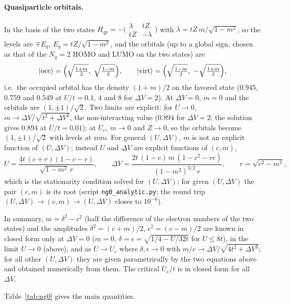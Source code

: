 \documentclass[11pt]{article}
\newcommand{\Ng}{N_{g}}
\newcommand{\dV}{\Delta V}
\begin{document}
\paragraph{Quasiparticle orbitals.} In the basis of the two states $H_{qp}=-\bigl(\begin{smallmatrix}\lambda & tZ\\ tZ & -\lambda\end{smallmatrix}\bigr)$ with $\lambda=tZ\,m/\sqrt{1-m^2}$, so the levels are $\mp E_q$, $E_q=tZ/\sqrt{1-m^2}$, and the orbitals (up to a global sign, chosen as that of the $\Ng=2$ HOMO and LUMO on the two states) are
\begin{equation}
  |{\rm occ}\rangle=\Bigl(\sqrt{\tfrac{1+m}{2}},\ \sqrt{\tfrac{1-m}{2}}\Bigr),\qquad
  |{\rm virt}\rangle=\Bigl(\sqrt{\tfrac{1-m}{2}},\ -\sqrt{\tfrac{1+m}{2}}\Bigr),
\end{equation}
i.e.\ the occupied orbital has the density $(1+m)/2$ on the favored state ($0.945$, $0.759$ and $0.549$ at $U/t=0.1$, $4$ and $8$ for $\dV=2$). At $\dV=0$, $m=0$ and the orbitals are $(1,\pm1)/\sqrt2$.
Two limits are explicit: for $U\to0$, $m\to\dV/\sqrt{t^2+\dV^2}$, the non-interacting value ($0.894$ for $\dV=2$; the solution gives $0.894$ at $U/t=0.01$); at $U_c$, $m\to0$ and $Z\to0$, so the orbitals become $(1,\pm1)/\sqrt2$ with levels at zero.
For general $(U,\dV)$, $m$ is not an explicit function of $(U,\dV)$; instead $U$ and $\dV$ are explicit functions of $(c,m)$,
\begin{equation}
  U=\frac{4t\,(c+r)(1-c-r)}{\sqrt{1-m^2}\,r},\qquad
  \dV=\frac{2t\,(1-c)\,m\,(1-c^2-rc)}{(1-m^2)^{3/2}\,r},\qquad r=\sqrt{c^2-m^2},
\end{equation}
which is the stationarity condition solved for $(U,\dV)$; for given $(U,\dV)$ the pair $(c,m)$ is its root (script \texttt{ng0\_analytic.py}; the round trip $(U,\dV)\to(c,m)\to(U,\dV)$ closes to $10^{-6}$).

\noindent In summary, $m=\delta^2-\epsilon^2$ (half the difference of the electron numbers of the two states) and the amplitudes $\delta^2=(c+m)/2$, $\epsilon^2=(c-m)/2$ are known in closed form only at $\dV=0$ ($m=0$, $\delta=\epsilon=\sqrt{1/4-U/32t}$ for $U\le8t$), in the limit $U\to0$ (above), and as $U\to U_c$ where $\delta,\epsilon\to0$ with $m/c\to\dV/\sqrt{4t^2+\dV^2}$; for all other $(U,\dV)$ they are given parametrically by the two equations above and obtained numerically from them. The critical $U_c/t$ is in closed form for all $\dV$.

Table~\ref{tab:ng0} gives the main quantities.
\end{document}
